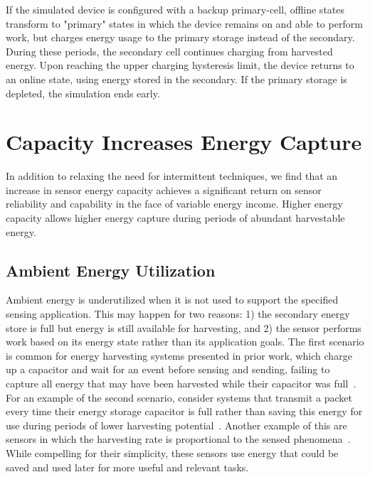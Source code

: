 If the simulated device is configured with a backup primary-cell, offline
states transform to "primary" states in which the device remains on and
able to perform work, but charges energy usage to the primary storage instead
of the secondary. During these periods, the secondary cell continues charging
from harvested energy. Upon reaching the upper charging hysteresis
limit, the device returns to an online state, using energy stored in the
secondary.  If the primary storage is depleted, the simulation ends early.


\section{Capacity Increases Energy Capture}
\label{sec:store}

In addition to relaxing the need for intermittent techniques, we find that
an increase in sensor energy capacity
achieves a significant return on sensor
reliability and capability in the face of variable energy income.  Higher
energy capacity allows higher energy capture during periods of abundant
harvestable energy.

\subsection{Ambient Energy Utilization}
\label{sec:store:utilization}

Ambient energy is underutilized when it is not used to support the specified
sensing application. This may happen for two reasons: 1) the secondary
energy store is full but energy is still available for harvesting, and 2) the
sensor performs work based on its energy state rather than its application
goals. The first scenario is common for energy harvesting systems
presented in prior work, which charge up a capacitor and wait for an event
before sensing and sending, failing to capture all energy that may
have been harvested while their capacitor was full~\cite{campbellEnergy14}.
For an example of the second scenario, consider
systems that transmit a packet every time their energy storage capacitor
is full rather than saving this energy for use during periods of lower harvesting
potential~\cite{hesterFlicker17, colinReconfigurable18}. Another example of this are sensors in which the harvesting
rate is proportional to the sensed phenomena~\cite{debruin2013monjolo}.
While compelling for their simplicity, these sensors use
energy that could be saved and used
later for more useful and relevant tasks.

